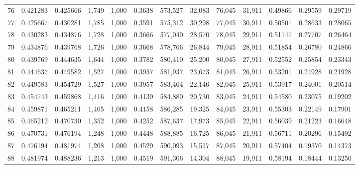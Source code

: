 \begin{tabular}{rrrrrrrrrrrrr}
76  &  0.421283 &  0.425666 &   1,749 &  1,000 &                                     0.3638 &  573,527 &   32,083 &   76,045 &   31,911 &  0.49866 &  0.29559 &  0.29719 \\
77  &  0.425667 &  0.430281 &   1,785 &  1,000 &                                     0.3591 &  575,312 &   30,298 &   77,045 &   30,911 &  0.50501 &  0.28633 &  0.28065 \\
78  &  0.430283 &  0.434876 &   1,728 &  1,000 &                                     0.3666 &  577,040 &   28,570 &   78,045 &   29,911 &  0.51147 &  0.27707 &  0.26464 \\
79  &  0.434876 &  0.439768 &   1,726 &  1,000 &                                     0.3668 &  578,766 &   26,844 &   79,045 &   28,911 &  0.51854 &  0.26780 &  0.24866 \\
80  &  0.439769 &  0.444635 &   1,644 &  1,000 &                                     0.3782 &  580,410 &   25,200 &   80,045 &   27,911 &  0.52552 &  0.25854 &  0.23343 \\
81  &  0.444637 &  0.449582 &   1,527 &  1,000 &                                     0.3957 &  581,937 &   23,673 &   81,045 &   26,911 &  0.53201 &  0.24928 &  0.21928 \\
82  &  0.449583 &  0.454729 &   1,527 &  1,000 &                                     0.3957 &  583,464 &   22,146 &   82,045 &   25,911 &  0.53917 &  0.24001 &  0.20514 \\
83  &  0.454743 &  0.459868 &   1,416 &  1,000 &                                     0.4139 &  584,880 &   20,730 &   83,045 &   24,911 &  0.54580 &  0.23075 &  0.19202 \\
84  &  0.459871 &  0.465211 &   1,405 &  1,000 &                                     0.4158 &  586,285 &   19,325 &   84,045 &   23,911 &  0.55303 &  0.22149 &  0.17901 \\
85  &  0.465212 &  0.470730 &   1,352 &  1,000 &                                     0.4252 &  587,637 &   17,973 &   85,045 &   22,911 &  0.56039 &  0.21223 &  0.16648 \\
86  &  0.470731 &  0.476194 &   1,248 &  1,000 &                                     0.4448 &  588,885 &   16,725 &   86,045 &   21,911 &  0.56711 &  0.20296 &  0.15492 \\
87  &  0.476194 &  0.481974 &   1,208 &  1,000 &                                     0.4529 &  590,093 &   15,517 &   87,045 &   20,911 &  0.57404 &  0.19370 &  0.14373 \\
88  &  0.481974 &  0.488236 &   1,213 &  1,000 &                                     0.4519 &  591,306 &   14,304 &   88,045 &   19,911 &  0.58194 &  0.18444 &  0.13250 \\

\end{tabular}
